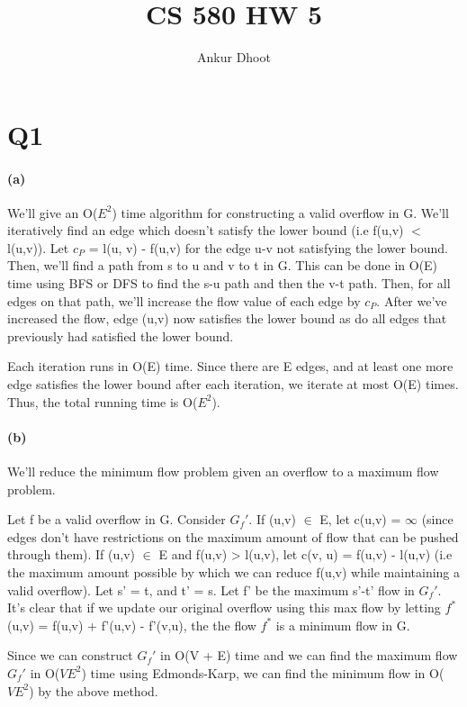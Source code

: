 \documentclass[11pt,a4paper]{article}
\begin{document}
\author{Ankur Dhoot}
\title{CS 580 HW 5}
\maketitle

\section*{Q1}

\paragraph*{(a)}

We'll give an O($E^{2}$) time algorithm for constructing a valid overflow in G. We'll iteratively find an edge which doesn't satisfy the lower bound (i.e f(u,v) $<$ l(u,v)). Let $c_{P}$ = l(u, v) - f(u,v) for the edge u-v not satisfying the lower bound. Then, we'll find a path from s to u and v to t in G. This can be done in O(E) time using BFS or DFS to find the s-u path and then the v-t path. Then, for all edges on that path, we'll increase the flow value of each edge by $c_{P}$. After we've increased the flow, edge (u,v) now satisfies the lower bound as do all edges that previously had satisfied the lower bound. 

Each iteration runs in O(E) time. Since there are E edges, and at least one more edge satisfies the lower bound after each iteration, we iterate at most O(E) times. Thus, the total running time is O($E^{2}$).

\paragraph*{(b)}
We'll reduce the minimum flow problem given an overflow to a maximum flow problem.

Let f be a valid overflow in G. Consider $G_{f}'$. If (u,v) $\in$ E, let c(u,v) = $\infty$ (since edges don't have restrictions on the maximum amount of flow that can be pushed through them). If (u,v) $\in$ E and f(u,v) > l(u,v), let c(v, u) = f(u,v) - l(u,v) (i.e the maximum amount possible by which we can reduce f(u,v) while maintaining a valid overflow). Let s' = t, and t' = s. Let f' be the maximum s'-t' flow in $G_{f}'$. It's clear that if we update our original overflow using this max flow by letting $f^{*}$(u,v) = f(u,v) + f'(u,v) - f'(v,u), the the flow $f^{*}$ is a minimum flow in G. 

Since we can construct $G_{f}'$ in O(V + E) time and we can find the maximum flow $G_{f}'$ in O($VE^{2}$) time using Edmonds-Karp, we can find the minimum flow in O($VE^{2}$) by the above method.
\end{document}
